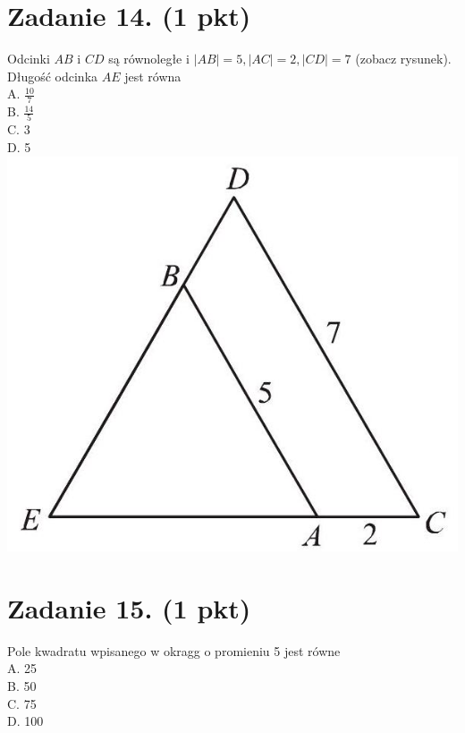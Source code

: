 \documentclass[10pt]{article}
\begin{document}
\section*{Zadanie 14. (1 pkt)}
Odcinki \(A B\) i \(C D\) są równoległe i \(|A B|=5,|A C|=2,|C D|=7\) (zobacz rysunek). Długość odcinka \(A E\) jest równa\\
A. \(\frac{10}{7}\)\\
B. \(\frac{14}{5}\)\\
C. 3\\
D. 5\\
\includegraphics[max width=\textwidth, center]{2024_11_21_dcf819de2d2eef051a0dg-06(1)}

\section*{Zadanie 15. (1 pkt)}
Pole kwadratu wpisanego w okragg o promieniu 5 jest równe\\
A. 25\\
B. 50\\
C. 75\\
D. 100
\end{document}
